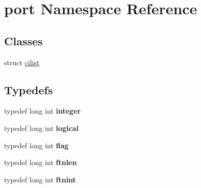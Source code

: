 \hypertarget{namespaceport}{\section{port Namespace Reference}
\label{namespaceport}
}
\subsection*{Classes}
\begin{DoxyCompactItemize}
\item 
struct \hyperlink{structport_1_1cilist}{cilist}
\end{DoxyCompactItemize}
\subsection*{Typedefs}
\begin{DoxyCompactItemize}
\item 
\hypertarget{namespaceport_ae85db026df5389a108098a6d5c0c4553}{typedef long int {\bfseries integer}}\label{namespaceport_ae85db026df5389a108098a6d5c0c4553}

\item 
\hypertarget{namespaceport_abf1248afcfbffb8b4a078e1e95c1f984}{typedef long int {\bfseries logical}}\label{namespaceport_abf1248afcfbffb8b4a078e1e95c1f984}

\item 
\hypertarget{namespaceport_afa328e51479b6b165a8a55953309b09d}{typedef long int {\bfseries flag}}\label{namespaceport_afa328e51479b6b165a8a55953309b09d}

\item 
\hypertarget{namespaceport_a5b6e4c5dc068eae00ea57b0d3efc3028}{typedef long int {\bfseries ftnlen}}\label{namespaceport_a5b6e4c5dc068eae00ea57b0d3efc3028}

\item 
\hypertarget{namespaceport_ac6c94197a2707fdb310ef2c6fb0a176a}{typedef long int {\bfseries ftnint}}\label{namespaceport_ac6c94197a2707fdb310ef2c6fb0a176a}

\end{DoxyCompactItemize}
